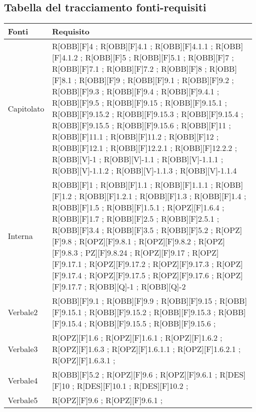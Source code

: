 \subsection{Tabella del tracciamento fonti-requisiti}
	\begin{table}[h]
		\centering
		\begin{tabular}{|p{}|p{}|}
			\toprule
			
			\textbf{Fonti} & \textbf{Requisito} \\
			
			\midrule

			Capitolato & R[OBB][F]4 ; R[OBB][F]4.1 ; R[OBB][F]4.1.1 ; R[OBB][F]4.1.2 ; R[OBB][F]5 ; R[OBB][F]5.1 ; R[OBB][F]7 ; R[OBB][F]7.1 ; R[OBB][F]7.2 ; R[OBB][F]8 ; R[OBB][F]8.1 ; R[OBB][F]9 ; R[OBB][F]9.1 ; R[OBB][F]9.2 ; R[OBB][F]9.3 ; R[OBB][F]9.4 ; R[OBB][F]9.4.1 ; R[OBB][F]9.5 ; R[OBB][F]9.15 ; R[OBB][F]9.15.1 ; R[OBB][F]9.15.2 ; R[OBB][F]9.15.3 ; R[OBB][F]9.15.4 ; R[OBB][F]9.15.5 ; R[OBB][F]9.15.6 ; R[OBB][F]11 ; R[OBB][F]11.1 ; R[OBB][F]11.2 ;  R[OBB][F]12 ; R[OBB][F]12.1 ; R[OBB][F]12.2.1 ; R[OBB][F]12.2.2 ; R[OBB][V]-1 ; R[OBB][V]-1.1 ; R[OBB][V]-1.1.1 ; R[OBB][V]-1.1.2 ; R[OBB][V]-1.1.3 ; R[OBB][V]-1.1.4 \\ \midrule
			Interna & R[OBB][F]1 ; R[OBB][F]1.1 ; R[OBB][F]1.1.1 ; R[OBB][F]1.2 ; R[OBB][F]1.2.1 ; R[OBB][F]1.3 ;  R[OBB][F]1.4 ; R[OBB][F]1.5 ; R[OBB][F]1.5.1 ; R[OPZ][F]1.6.4 ; R[OBB][F]1.7 ; R[OBB][F]2.5 ; R[OBB][F]2.5.1 ; R[OBB][F]3.4 ; R[OBB][F]3.5 ; R[OBB][F]5.2 ; R[OPZ][F]9.8 ; R[OPZ][F]9.8.1 ; R[OPZ][F]9.8.2 ; R[OPZ][F]9.8.3 ; PZ][F]9.8.24 ; R[OPZ][F]9.17 ; R[OPZ][F]9.17.1 ; R[OPZ][F]9.17.2 ; R[OPZ][F]9.17.3 ; R[OPZ][F]9.17.4 ; R[OPZ][F]9.17.5 ; R[OPZ][F]9.17.6 ; R[OPZ][F]9.17.7 ; R[OBB][Q]-1 ; R[OBB][Q]-2 \\ \midrule
			Verbale2 & R[OBB][F]9.1 ; R[OBB][F]9.9 ; R[OBB][F]9.15 ; R[OBB][F]9.15.1 ; R[OBB][F]9.15.2 ; R[OBB][F]9.15.3 ; R[OBB][F]9.15.4 ; R[OBB][F]9.15.5 ; R[OBB][F]9.15.6 ;  \\ \midrule
			Verbale3 & R[OPZ][F]1.6 ; R[OPZ][F]1.6.1 ; R[OPZ][F]1.6.2 ; R[OPZ][F]1.6.3 ; R[OPZ][F]1.6.1.1 ; R[OPZ][F]1.6.2.1 ; R[OPZ][F]1.6.3.1 ; \\ \midrule
			Verbale4 & R[OBB][F]5.2 ; R[OPZ][F]9.6 ; R[OPZ][F]9.6.1 ; R[DES][F]10 ; R[DES][F]10.1 ; R[DES][F]10.2 ; \\ \midrule
			Verbale5 & R[OPZ][F]9.6 ; R[OPZ][F]9.6.1 ;  \\ \midrule

		\end{tabular}
	\end{table}

